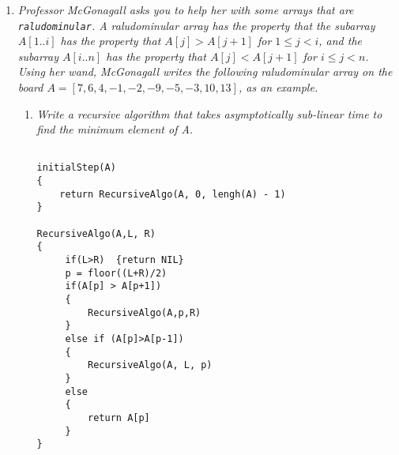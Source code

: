 \documentclass[12pt]{article} \setlength{\oddsidemargin}{0in}
\begin{document}
\begin{enumerate} [label=\textbf{\arabic*}.]
  Adding the number of operations from the code we obtain:\\
  $T(n) = 2(T)(\frac{n}{3}) + 1$ (The +1 comes from $print$ function) \\ \\
  The Master Theorem can be used here since our function has the form\\ $T(n) = a(T)(\frac{n}{b}) + f(n)$ where our $a =2, b=3$, and $f(n) = 1$.\\
  To find which case we have, we compare $f(n)$ with $n^{log_32}$.\\ I$n^{log_32}$ is larger than $f(n)$.\\
  We fall into the case number 1. of the $Master Theorem$ as is cited in the CLRS book. \\\\
  $\Rightarrow \mathbf{\Theta (n^{log_32})}$ is the answer.\\
  
  \footnote{Worked with: George Allison, Eric Oropeza, Michael Merola, Gustav Solis, Krish Dholakiyq, Selena Quintanilla}
  
  \newpage 


\item \textit{Professor McGonagall asks you to help her with some
    arrays that are \texttt{raludominular}. A raludominular array has
    the property that the subarray $A[1..i]$ has the property that
    $A[j] > A[j + 1]$ for $1 \le j < i$, and the subarray $A[i..n]$ has
    the property that $A[j] < A[j + 1]$ for $i \le j < n$. Using her
    wand, McGonagall writes the following raludominular array on the
    board $A = [7, 6, 4, -1, -2, -9, -5, -3, 10, 13]$, as an example.}

  \begin{enumerate}  [label=\textbf{\alph*})]
  \item \textit{Write a recursive algorithm that takes asymptotically
      sub-linear time to find the minimum element of A.}
    
    \begin{verbatim}

initialStep(A)
{ 
    return RecursiveAlgo(A, 0, lengh(A) - 1)      
}

RecursiveAlgo(A,L, R)
{
     if(L>R)  {return NIL}
     p = floor((L+R)/2)
     if(A[p] > A[p+1])
     {
         RecursiveAlgo(A,p,R)
     }
     else if (A[p]>A[p-1])
     {
         RecursiveAlgo(A, L, p)
     }
     else
     { 
         return A[p]
     }
}







\end{verbatim}
\end{enumerate}
\end{enumerate}
\end{document}
